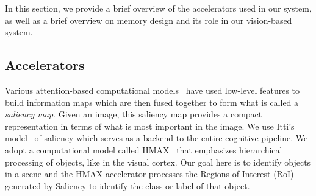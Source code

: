In this section, we provide a brief overview of the accelerators used in our system, as well as a brief overview on memory design and its role in our vision-based system. 

\subsection{Accelerators}
Various attention-based computational models~\cite{Itti2001,Bruce2009a} have used low-level features to build information maps which are then fused together to form what is called a \emph{saliency map}. Given an image, this saliency map provides a compact representation in terms of what is most important in the image. 
We use Itti's model~\cite{Peters2007} of saliency which serves as a backend to the entire cognitive pipeline. 
We adopt a computational model called HMAX~\cite{Mutch2008} that emphasizes hierarchical processing of objects, like in the visual cortex. Our goal here is to identify objects in a scene and the HMAX accelerator processes the Regions of Interest (RoI) generated by Saliency to identify the class or label of that object. 
